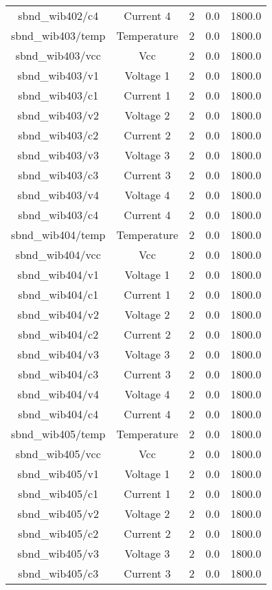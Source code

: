\begin{center}
\begin{longtable}{c | c c c c }
sbnd\_wib402/c4 & Current 4 & 2 & 0.0 & 1800.0\\ 
sbnd\_wib403/temp & Temperature & 2 & 0.0 & 1800.0\\ 
sbnd\_wib403/vcc & Vcc & 2 & 0.0 & 1800.0\\ 
sbnd\_wib403/v1 & Voltage 1 & 2 & 0.0 & 1800.0\\ 
sbnd\_wib403/c1 & Current 1 & 2 & 0.0 & 1800.0\\ 
sbnd\_wib403/v2 & Voltage 2 & 2 & 0.0 & 1800.0\\ 
sbnd\_wib403/c2 & Current 2 & 2 & 0.0 & 1800.0\\ 
sbnd\_wib403/v3 & Voltage 3 & 2 & 0.0 & 1800.0\\ 
sbnd\_wib403/c3 & Current 3 & 2 & 0.0 & 1800.0\\ 
sbnd\_wib403/v4 & Voltage 4 & 2 & 0.0 & 1800.0\\ 
sbnd\_wib403/c4 & Current 4 & 2 & 0.0 & 1800.0\\ 
sbnd\_wib404/temp & Temperature & 2 & 0.0 & 1800.0\\ 
sbnd\_wib404/vcc & Vcc & 2 & 0.0 & 1800.0\\ 
sbnd\_wib404/v1 & Voltage 1 & 2 & 0.0 & 1800.0\\ 
sbnd\_wib404/c1 & Current 1 & 2 & 0.0 & 1800.0\\ 
sbnd\_wib404/v2 & Voltage 2 & 2 & 0.0 & 1800.0\\ 
sbnd\_wib404/c2 & Current 2 & 2 & 0.0 & 1800.0\\ 
sbnd\_wib404/v3 & Voltage 3 & 2 & 0.0 & 1800.0\\ 
sbnd\_wib404/c3 & Current 3 & 2 & 0.0 & 1800.0\\ 
sbnd\_wib404/v4 & Voltage 4 & 2 & 0.0 & 1800.0\\ 
sbnd\_wib404/c4 & Current 4 & 2 & 0.0 & 1800.0\\ 
sbnd\_wib405/temp & Temperature & 2 & 0.0 & 1800.0\\ 
sbnd\_wib405/vcc & Vcc & 2 & 0.0 & 1800.0\\ 
sbnd\_wib405/v1 & Voltage 1 & 2 & 0.0 & 1800.0\\ 
sbnd\_wib405/c1 & Current 1 & 2 & 0.0 & 1800.0\\ 
sbnd\_wib405/v2 & Voltage 2 & 2 & 0.0 & 1800.0\\ 
sbnd\_wib405/c2 & Current 2 & 2 & 0.0 & 1800.0\\ 
sbnd\_wib405/v3 & Voltage 3 & 2 & 0.0 & 1800.0\\ 
sbnd\_wib405/c3 & Current 3 & 2 & 0.0 & 1800.0\\ 

\end{longtable}
\end{center}
